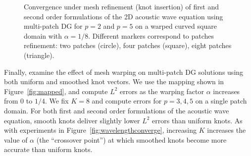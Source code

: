 \documentclass[preprint,10pt]{elsarticle}
\newcommand{\reviewerOne}[1]{#1}
\begin{document}
\begin{figure}
{
}
\caption{Convergence under mesh refinement (knot insertion) of first and second order formulations of the 2D acoustic wave equation using multi-patch DG for $p = 2$ and $p=5$ on \reviewerOne{a warped curved square domain with $\alpha = 1/8$}.  Different markers correspond to patches refinement: two patches (circle), four patches (square), eight patches (triangle).  }
\label{fig:convergence2D}
\end{figure}

Finally, examine the effect of mesh warping on multi-patch DG solutions using both uniform and smoothed knot vectors.  We use the mapping shown in Figure~\ref{fig:mapped}, and compute $L^2$ errors as the warping factor $\alpha$ increases from $0$ to $1/4$.  We fix $K = 8$ and compute errors for $p = 3, 4, 5$ on a single patch domain.  For both first and second order formulations of the acoustic wave equation, smooth knots deliver slightly lower $L^2$ errors than uniform knots.  As with experiments in Figure~\ref{fig:wavelengthconverge}, increasing $K$ increases the value of $\alpha$ (the ``crossover point'') at which smoothed knots become more accurate than uniform knots.  
\end{document}
